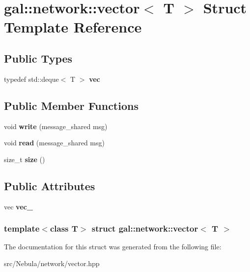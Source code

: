 \hypertarget{structgal_1_1network_1_1vector}{\section{gal\-:\-:network\-:\-:vector$<$ \-T $>$ \-Struct \-Template \-Reference}
\label{structgal_1_1network_1_1vector}
}
\subsection*{\-Public \-Types}
\begin{DoxyCompactItemize}
\item 
\hypertarget{structgal_1_1network_1_1vector_af890cdbf59fd597b4034c4edf9a1826c}{typedef std\-::deque$<$ \-T $>$ {\bfseries vec}}\label{structgal_1_1network_1_1vector_af890cdbf59fd597b4034c4edf9a1826c}

\end{DoxyCompactItemize}
\subsection*{\-Public \-Member \-Functions}
\begin{DoxyCompactItemize}
\item 
\hypertarget{structgal_1_1network_1_1vector_aad0e2d9ae7b9eb9af0173690fca44db6}{void {\bfseries write} (message\-\_\-shared msg)}\label{structgal_1_1network_1_1vector_aad0e2d9ae7b9eb9af0173690fca44db6}

\item 
\hypertarget{structgal_1_1network_1_1vector_a9049ddcdf1c2f6e5722899f8363162fc}{void {\bfseries read} (message\-\_\-shared msg)}\label{structgal_1_1network_1_1vector_a9049ddcdf1c2f6e5722899f8363162fc}

\item 
\hypertarget{structgal_1_1network_1_1vector_adbffe90ff20f537ee98b611e0a5f474c}{size\-\_\-t {\bfseries size} ()}\label{structgal_1_1network_1_1vector_adbffe90ff20f537ee98b611e0a5f474c}

\end{DoxyCompactItemize}
\subsection*{\-Public \-Attributes}
\begin{DoxyCompactItemize}
\item 
\hypertarget{structgal_1_1network_1_1vector_a4efde91878f4a0e451955b18dcc6a7bd}{vec {\bfseries vec\-\_\-}}\label{structgal_1_1network_1_1vector_a4efde91878f4a0e451955b18dcc6a7bd}

\end{DoxyCompactItemize}
\subsubsection*{template$<$class T$>$ struct gal\-::network\-::vector$<$ T $>$}



\-The documentation for this struct was generated from the following file\-:\begin{DoxyCompactItemize}
\item 
src/\-Nebula/network/vector.\-hpp\end{DoxyCompactItemize}
